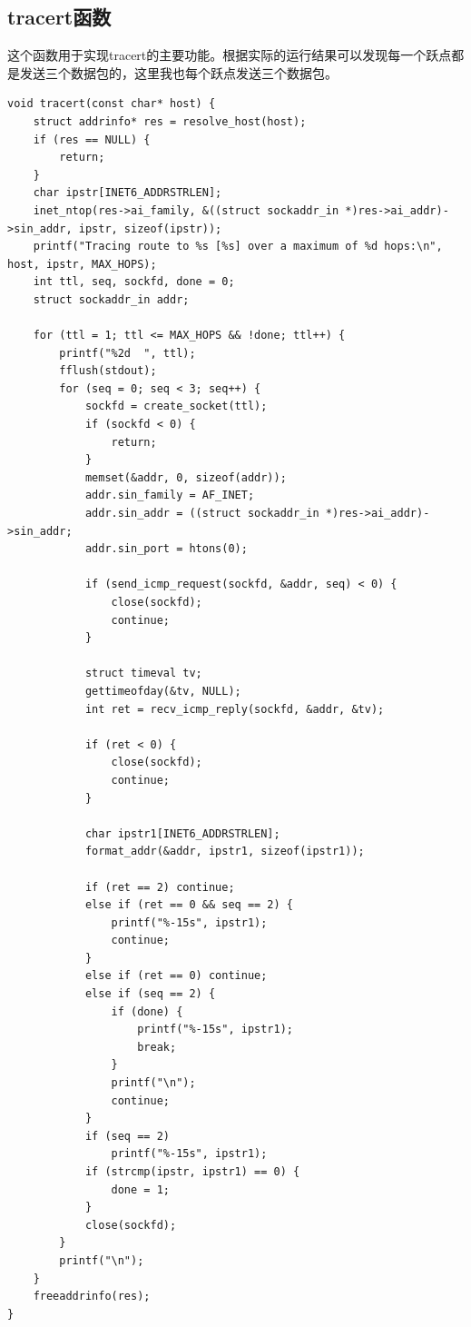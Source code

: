 \documentclass[12pt]{ctexart}
\begin{document}
    \subsection{tracert函数}

    这个函数用于实现tracert的主要功能。根据实际的运行结果可以发现每一个跃点都是发送三个数据包的，这里我也每个跃点发送三个数据包。

    \begin{lstlisting}
void tracert(const char* host) {
    struct addrinfo* res = resolve_host(host);
    if (res == NULL) {
        return;
    }
    char ipstr[INET6_ADDRSTRLEN];
    inet_ntop(res->ai_family, &((struct sockaddr_in *)res->ai_addr)->sin_addr, ipstr, sizeof(ipstr));
    printf("Tracing route to %s [%s] over a maximum of %d hops:\n", host, ipstr, MAX_HOPS);
    int ttl, seq, sockfd, done = 0;
    struct sockaddr_in addr;

    for (ttl = 1; ttl <= MAX_HOPS && !done; ttl++) {
        printf("%2d  ", ttl);
        fflush(stdout);
        for (seq = 0; seq < 3; seq++) {
            sockfd = create_socket(ttl);
            if (sockfd < 0) {
                return;
            }
            memset(&addr, 0, sizeof(addr));
            addr.sin_family = AF_INET;
            addr.sin_addr = ((struct sockaddr_in *)res->ai_addr)->sin_addr;
            addr.sin_port = htons(0);
    
            if (send_icmp_request(sockfd, &addr, seq) < 0) {
                close(sockfd);
                continue;
            }

            struct timeval tv;
            gettimeofday(&tv, NULL);
            int ret = recv_icmp_reply(sockfd, &addr, &tv);

            if (ret < 0) {
                close(sockfd);
                continue;
            }

            char ipstr1[INET6_ADDRSTRLEN];
            format_addr(&addr, ipstr1, sizeof(ipstr1));
            
            if (ret == 2) continue;
            else if (ret == 0 && seq == 2) {
                printf("%-15s", ipstr1); 
                continue;
            }
            else if (ret == 0) continue;
            else if (seq == 2) {
                if (done) {
                    printf("%-15s", ipstr1); 
                    break;
                }
                printf("\n");
                continue;
            }
            if (seq == 2)
                printf("%-15s", ipstr1); 
            if (strcmp(ipstr, ipstr1) == 0) {
                done = 1;
            }
            close(sockfd);
        }
        printf("\n");
    }
    freeaddrinfo(res);
}
\end{lstlisting}
\end{document}

